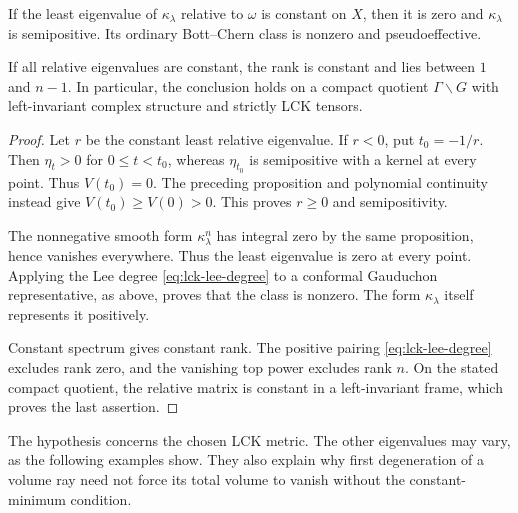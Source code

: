 \begin{theorem}\label{lck:constant-minimum-lee}
If the least eigenvalue of $\kappa_\lambda$ relative to
$\omega$ is constant on $X$, then it is zero and
$\kappa_\lambda$ is semipositive. Its ordinary Bott--Chern
class is nonzero and pseudoeffective.

If all relative eigenvalues are constant, the rank is constant
and lies between $1$ and $n-1$. In particular, the conclusion
holds on a compact quotient $\Gamma\backslash G$ with
left-invariant complex structure and strictly LCK tensors.
\end{theorem}
\begin{proof}
Let $r$ be the constant least relative eigenvalue. If $r<0$,
put $t_0=-1/r$. Then $\eta_t>0$ for $0\leq t<t_0$,
whereas $\eta_{t_0}$ is semipositive with a kernel at every
point. Thus $V(t_0)=0$. The preceding proposition and
polynomial continuity instead give $V(t_0)\geq V(0)>0$.
This proves $r\geq0$ and semipositivity.

The nonnegative smooth form $\kappa_\lambda^n$ has integral
zero by the same proposition, hence vanishes everywhere.
Thus the least eigenvalue is zero at every point. Applying
the Lee degree \eqref{eq:lck-lee-degree} to a conformal
Gauduchon representative, as above, proves that the class is
nonzero. The form $\kappa_\lambda$ itself represents it positively.

Constant spectrum gives constant rank. The positive pairing
\eqref{eq:lck-lee-degree} excludes rank zero, and the vanishing
top power excludes rank $n$. On the stated compact quotient,
the relative matrix is constant in a left-invariant frame,
which proves the last assertion.
\end{proof}

The hypothesis concerns the chosen LCK metric. The other
eigenvalues may vary, as the following examples show. They also
explain why first degeneration of a volume ray need not force
its total volume to vanish without the constant-minimum condition.

